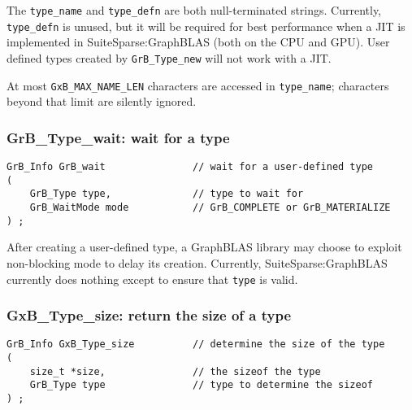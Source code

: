 \documentclass[12pt]{article}
\begin{document}
{The \verb'type_name' and \verb'type_defn' are both null-terminated strings.
Currently, \verb'type_defn' is unused, but it will be required for best
performance when a JIT is implemented in SuiteSparse:GraphBLAS (both on the CPU
and GPU).  User defined types created by \verb'GrB_Type_new' will not work with
a JIT.

At most \verb'GxB_MAX_NAME_LEN' characters are accessed in \verb'type_name';
characters beyond that limit are silently ignored.

\subsubsection{{\sf GrB\_Type\_wait:} wait for a type}
\label{type_wait}

\begin{mdframed}[userdefinedwidth=6in]
{\footnotesize
\begin{verbatim}
GrB_Info GrB_wait               // wait for a user-defined type
(
    GrB_Type type,              // type to wait for
    GrB_WaitMode mode           // GrB_COMPLETE or GrB_MATERIALIZE
) ;
\end{verbatim}
}\end{mdframed}

After creating a user-defined type, a GraphBLAS library may choose to exploit
non-blocking mode to delay its creation.  Currently, SuiteSparse:GraphBLAS
currently does nothing except to ensure that \verb'type' is valid.

\subsubsection{{\sf GxB\_Type\_size:} return the size of a type}
\label{type_size}

\begin{mdframed}[userdefinedwidth=6in]
{\footnotesize
\begin{verbatim}
GrB_Info GxB_Type_size          // determine the size of the type
(
    size_t *size,               // the sizeof the type
    GrB_Type type               // type to determine the sizeof
) ;
\end{verbatim}
}\end{mdframed}

}
\end{document}
